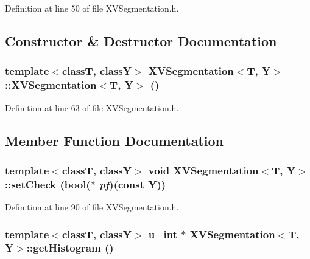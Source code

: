 Definition at line 50 of file XVSegmentation.h.

\subsection{Constructor \& Destructor Documentation}
\label{XVSegmentation_a0}
\hypertarget{class_XVSegmentation_a0}{
\subsubsection[XVSegmentation]{\setlength{\rightskip}{0pt plus 5cm}template$<$classT, classY$>$ XVSegmentation$<$T, Y$>$::XVSegmentation$<$T, Y$>$ ()}}




Definition at line 63 of file XVSegmentation.h.

\subsection{Member Function Documentation}
\label{XVSegmentation_a8}
\hypertarget{class_XVSegmentation_a8}{
\subsubsection[setCheck]{\setlength{\rightskip}{0pt plus 5cm}template$<$classT, classY$>$ void XVSegmentation$<$T, Y$>$::set\-Check (bool($\ast$ {\em pf})(const Y))}}




Definition at line 90 of file XVSegmentation.h.\label{XVSegmentation_a9}
\hypertarget{class_XVSegmentation_a9}{
\subsubsection[getHistogram]{\setlength{\rightskip}{0pt plus 5cm}template$<$classT, classY$>$ u\_\-int $\ast$ XVSegmentation$<$T, Y$>$::get\-Histogram ()}}




